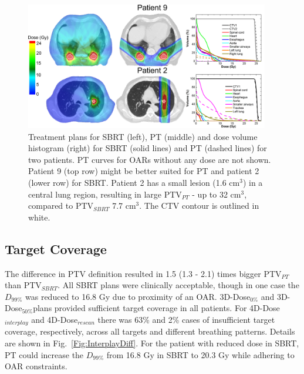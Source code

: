 \begin{figure}[H]
\begin{center}
\includegraphics[width=0.95\textwidth]{./PatientStudy/Images/Figure2.png}
%   
%   
%   
% 
%   
%   
% 
%   
%   
%   
%   
%   
%   
%   
%   
\caption{Treatment plans for SBRT (left), PT (middle) and dose volume histogram (right) for SBRT (solid lines) and PT (dashed lines) for two patients. PT curves for OARs without any dose are not shown. Patient 9 (top row) might be better suited for PT and patient 2 (lower row) for SBRT. Patient 2 has a small lesion (1.6 cm$^{3}$) in a central lung region, resulting in large PTV$_{PT}$ - up to 32 cm$^{3}$, compared to PTV$_{SBRT}$ 7.7 cm$^{3}$. The CTV contour is outlined in white.}
\label{Fig:TreatmentPlans}
\end{center}
\end{figure}

\subsection{Target Coverage}

The difference in PTV definition resulted in 1.5 (1.3 - 2.1) times bigger PTV$_{PT}$ than PTV$_{SBRT}$. All SBRT plans were clinically acceptable, though in one case the $D_{99\%}$ was reduced to 16.8 Gy due to proximity of an OAR. 3D-Dose$_{0\%}$ and 3D-Dose$_{50\%}$plans provided sufficient target coverage in all patients. For 4D-Dose$_{interplay}$ and 4D-Dose$_{rescan}$ there was 63\% and 2\% cases of insufficient target coverage, respectively, across all targets and different breathing patterns. Details are shown in Fig.~\ref{Fig:InterplayDiff}. For the patient with reduced dose in SBRT, PT could increase the $D_{99\%}$ from 16.8 Gy in SBRT to 20.3 Gy while adhering to OAR constraints. 

